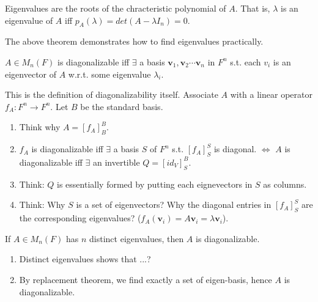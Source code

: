 \documentclass[12pt]{article}
\begin{document}
\begin{theorem}
    Eigenvalues are the roots of the chracteristic polynomial of $A$.
    That is, $\lambda$ is an eigenvalue of $A$ iff $p_A(\lambda)=det(A-\lambda I_n) = 0.$
\end{theorem}

\begin{remark}
    The above theorem demonstrates how to find eigenvalues practically.
\end{remark}


\begin{theorem}
$A\in M_n(F)$ is diagonalizable iff $\exists$ a basis ${\mathbf{v}_1,\mathbf{v}_2\cdots\mathbf{v}_n}$ in $F^n$ s.t. each $v_i$ is an eigenvector of $A$ w.r.t. some eigenvalue $\lambda_i$.
\end{theorem}

\begin{pfbox}
    This is the definition of diagonalizability itself.
    Associate $A$ with a linear operator $f_A:F^n\rightarrow F^n$. Let $B$ be the standard basis.
    \begin{enumerate}
        \item Think why $A=[f_A]^B_{B}$.
        \item $f_A$ is diagonalizable iff $\exists$ a basis $S$ of $F^n$ s.t. $[f_A]^{S}_{S}$ is diagonal.
        $\Leftrightarrow$ $A$ is diagonalizable iff $\exists$ an invertible $Q=[id_V]^{B}_{S}$.
        \item Think: $Q$ is essentially formed by putting each eignevectors in $S$ as columns. 
        \item Think: Why $S$ is a set of eigenvectors? Why the diagonal entries in $[f_A]^{S}_{S}$ are the corresponding eigenvalues? ($f_A(\mathbf{v}_i) = A\mathbf{v}_i = \lambda\mathbf{v}_i$).
    \end{enumerate}
\end{pfbox}

\begin{theorem}
    If $A\in M_n(F)$ has $n$ distinct eigenvalues, then $A$ is diagonalizable.
\end{theorem}

\begin{pfbox}
    \begin{enumerate}
        \item Distinct eigenvalues shows that ...?
        \item By replacement theorem, we find exactly a set of eigen-basis, hence $A$ is diagonalizable.
    \end{enumerate}
\end{pfbox}
\end{document}
